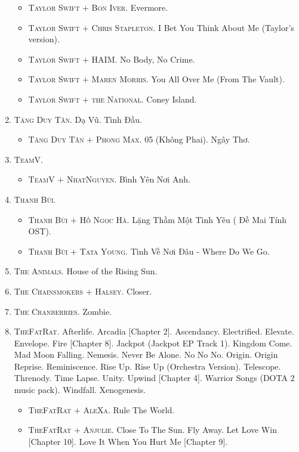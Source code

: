 \documentclass[oneside]{book}
\numberwithin{equation}{section}
\begin{document}
\begin{enumerate}
	\begin{itemize}
		\item \textsc{Taylor Swift $+$ Bon Iver.} Evermore.
		\item \textsc{Taylor Swift $+$ Chris Stapleton.} I Bet You Think About Me (Taylor's version).
		\item \textsc{Taylor Swift $+$ HAIM.} No Body, No Crime.
		\item \textsc{Taylor Swift $+$ Maren Morris.} You All Over Me (From The Vault).
		\item \textsc{Taylor Swift $+$ the National.} Coney Island.
	\end{itemize}
	\item \textsc{Tăng Duy Tân.} Dạ Vũ. Tình Đầu.
	\begin{itemize}
		\item \textsc{Tăng Duy Tân $+$ Phong Max.} 05 (Không Phai). Ngây Thơ.
	\end{itemize}	
	\item \textsc{TeamV.}
	\begin{itemize}
		\item \textsc{TeamV $+$ NhatNguyen.} Bình Yên Nơi Anh.
	\end{itemize}
	\item \textsc{Thanh Bùi.}
	\begin{itemize}
		\item \textsc{Thanh Bùi $+$ Hồ Ngọc Hà.} Lặng Thầm Một Tình Yêu ( Đề Mai Tính OST).
		\item \textsc{Thanh Bùi $+$ Tata Young.} Tình Về Nơi Đâu - Where Do We Go.
	\end{itemize}
	\item \textsc{The Animals.} House of the Rising Sun.
	\item \textsc{The Chainsmokers $+$ Halsey.} Closer.
	\item \textsc{The Cranberries.} Zombie.
	\item \textsc{TheFatRat.} Afterlife. Arcadia [Chapter 2]. Ascendancy. Electrified. Elevate. Envelope. Fire [Chapter 8]. Jackpot (Jackpot EP Track 1). Kingdom Come. Mad Moon Falling. Nemesis. Never Be Alone. No No No. Origin. Origin Reprise. Reminiscence. Rise Up. Rise Up (Orchestra Version). Telescope. Threnody. Time Lapse. Unity. Upwind [Chapter 4]. Warrior Songs (DOTA 2 music pack). Windfall. Xenogenesis.
	\begin{itemize}
		\item \textsc{TheFatRat $+$ AleXa.} Rule The World.
		\item \textsc{TheFatRat $+$ Anjulie.} Close To The Sun. Fly Away. Let Love Win [Chapter 10]. Love It When You Hurt Me [Chapter 9].

\end{itemize}
\end{enumerate}
\end{document}
